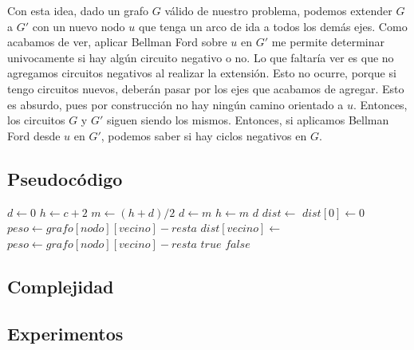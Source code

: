 Con esta idea, dado un grafo  $G$ válido de nuestro problema, podemos extender $G$ a $G'$ con un nuevo nodo $u$ que tenga un arco de ida a todos los demás ejes. Como acabamos de ver, aplicar Bellman Ford sobre $u$ en $G'$ me permite determinar univocamente si hay algún circuito negativo o no. Lo que faltaría ver es que no agregamos circuitos negativos al realizar la extensión. Esto no ocurre, porque si tengo circuitos nuevos, deberán pasar por los ejes que acabamos de agregar. Esto es absurdo, pues por construcción no hay ningún camino orientado a $u$. Entonces, los circuitos $G$ y $G'$ siguen siendo los mismos. Entonces, si aplicamos Bellman Ford desde $u$ en $G'$, podemos saber si hay ciclos negativos en $G$. \\



\subsection{Pseudocódigo}

\begin{algorithm}
\label{resolver}         %
\begin{algorithmic}
    \State $d \gets 0$
	\State $h \gets c + 2$
		\State $m \gets (h + d)/2$
			\State $d \gets m$
		\Else
			\State $h \gets m$
		\EndIf
	\EndWhile
	\Return $d$
\EndFunction
{}
	\State $dist \gets$ 
	\State $dist[0] \gets 0$
				\State $peso \gets grafo[nodo][vecino] - resta$
				\State $dist[vecino] \gets$ 
			\EndFor
		\EndFor
	\EndFor
	\Return {}
\EndFunction
{}
			\State $peso \gets grafo[nodo][vecino] - resta$
				\Return $true$
			\EndIf
		\EndFor
	\EndFor
	\Return $false$
\EndFunction
\end{algorithmic}
\end{algorithm}

\subsection{Complejidad}

\subsection{Experimentos}